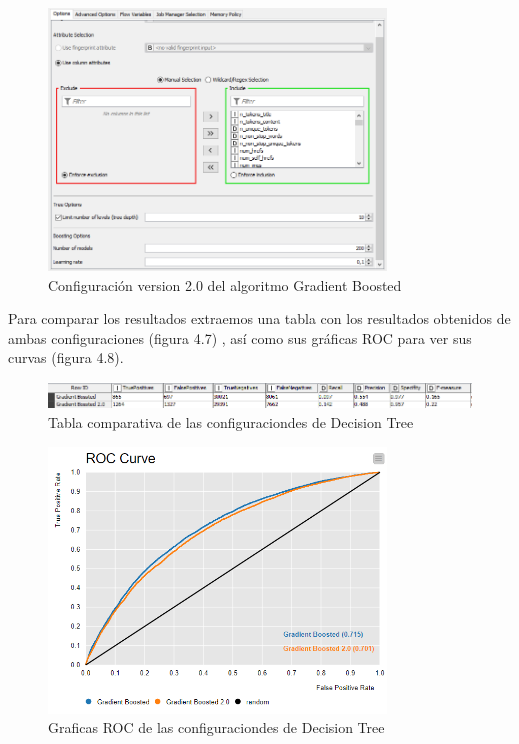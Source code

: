 	\begin{figure}[htb]
		\centering
		\includegraphics[width=0.8\textwidth]{./imagenes/45}
		\caption{Configuración version 2.0 del algoritmo Gradient Boosted} \label{fig:1}
	\end{figure}
	
	Para comparar los resultados extraemos una tabla con los resultados obtenidos de ambas configuraciones (figura 4.7) , así como sus gráficas ROC para ver sus curvas (figura 4.8). \\
	
	\begin{figure}[htb]
		\centering
		\includegraphics[width=1.0\textwidth]{./imagenes/46}
		\caption{Tabla comparativa de las configuraciondes de Decision Tree} \label{fig:1}
	\end{figure}
	
	\begin{figure}[htb]
		\centering
		\includegraphics[width=0.8\textwidth]{./imagenes/47}
		\caption{Graficas ROC de las configuraciondes de Decision Tree} \label{fig:1}
	\end{figure}
	
